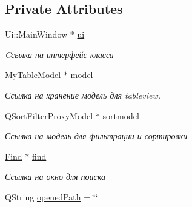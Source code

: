 \subsection*{Private Attributes}
\begin{DoxyCompactItemize}
\item 
\mbox{\label{class_main_window_a35466a70ed47252a0191168126a352a5}} 
Ui\+::\+Main\+Window $\ast$ \mbox{\hyperlink{class_main_window_a35466a70ed47252a0191168126a352a5}{ui}}
\begin{DoxyCompactList}\small\item\em Cсылка на интерфейс класса \end{DoxyCompactList}\item 
\mbox{\label{class_main_window_a5d57df9c9e92fef255b4dfed30ab4d06}} 
\mbox{\hyperlink{class_my_table_model}{My\+Table\+Model}} $\ast$ \mbox{\hyperlink{class_main_window_a5d57df9c9e92fef255b4dfed30ab4d06}{model}}
\begin{DoxyCompactList}\small\item\em Ссылка на хранение модель для tableview. \end{DoxyCompactList}\item 
\mbox{\label{class_main_window_ae4527d1272b30a9d4f7d824dd1204045}} 
Q\+Sort\+Filter\+Proxy\+Model $\ast$ \mbox{\hyperlink{class_main_window_ae4527d1272b30a9d4f7d824dd1204045}{sortmodel}}
\begin{DoxyCompactList}\small\item\em Ссылка на модель для фильтрации и сортировки \end{DoxyCompactList}\item 
\mbox{\label{class_main_window_aa25af28a38938a9fc8d70e9c6e02b10d}} 
\mbox{\hyperlink{class_find}{Find}} $\ast$ \mbox{\hyperlink{class_main_window_aa25af28a38938a9fc8d70e9c6e02b10d}{find}}
\begin{DoxyCompactList}\small\item\em Ссылка на окно для поиска \end{DoxyCompactList}\item 
\mbox{\label{class_main_window_af3180a4d5c005381bbc2e7a19e9f9f80}} 
Q\+String \mbox{\hyperlink{class_main_window_af3180a4d5c005381bbc2e7a19e9f9f80}{opened\+Path}} = \char`\"{}\char`\"{}

\end{DoxyCompactItemize}
